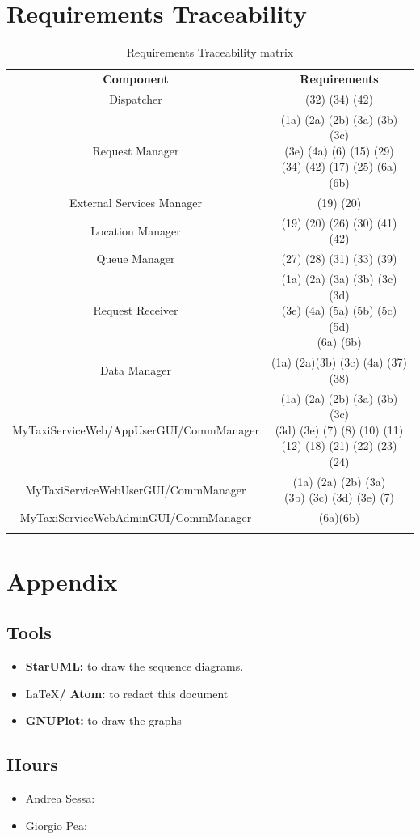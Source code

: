 \documentclass[11pt,titlepage]{article} %
\begin{document}
\newpage
\section{Requirements Traceability}
	\begin{table}[h]
		\centering
		\begin{tabular}{|| c || c ||}
			\hhline{|t:==:t|}
  			\textbf{Component} & \textbf{Requirements} \\
			\hhline{|:=|=:|}
 			Dispatcher & (32)  (34) (42)\\
			\hhline{|:-|-:|}
 			Request Manager &  \pbox{10cm}{(1a) (2a) (2b) (3a) (3b) (3c)\\ (3e) (4a) (6) (15) (29) \\ (34) (42) (17) (25) (6a) (6b)} \\
			\hhline{|:-|-:|}
 			External Services Manager &  (19) (20)\\
			\hhline{|:-|-:|}
 			Location Manager & (19) (20) (26) (30) (41) (42)\\
			\hhline{|:-|-:|}
 			Queue Manager &  (27) (28) (31) (33) (39)\\
			\hhline{|:-|-:|}
 			Request Receiver &\pbox{10cm}{(1a) (2a) (3a) (3b) (3c) (3d)\\ (3e) (4a) (5a) (5b) (5c) (5d)\\(6a) (6b)}\\
			\hhline{|:-|-:|}
 			Data Manager &  (1a) (2a)(3b) (3c) (4a) (37) (38) \\
			\hhline{|:-|-:|}
 			MyTaxiServiceWeb/AppUserGUI/CommManager & \pbox{10cm}{(1a) (2a) (2b) (3a) (3b) (3c) \\ (3d) (3e) (7) (8) (10) (11) \\ (12) (18) (21) (22) (23) (24)} \\
			\hhline{|:-|-:|}
 			MyTaxiServiceWebUserGUI/CommManager &  \pbox{10cm}{(1a) (2a) (2b) (3a) \\ (3b) (3c) (3d) (3e) (7)}\\
			\hhline{|:-|-:|}
			MyTaxiServiceWebAdminGUI/CommManager & (6a)(6b) \\ 
			\hhline{|b:==:b|}
		\end{tabular}
		\caption{Requirements Traceability matrix}
\end{table}

\newpage
\section{Appendix}
	\subsection{Tools}
		\begin{itemize}
			\item \textbf{StarUML:} to draw the sequence diagrams.
			\item \LaTeX \textbf{/ Atom:} to redact this document
			\item \textbf{GNUPlot:} to draw the graphs
		\end{itemize}

	\subsection{Hours}
		\begin{itemize}
			\item Andrea Sessa:
			\item Giorgio Pea:
		\end{itemize}
\end{document}
